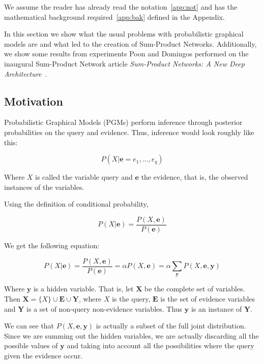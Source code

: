 \documentclass[a4paper,10pt]{article}
\theoremstyle{plain}
\begin{document}
We assume the reader has already read the notation~\ref{app:not} and has the mathematical
background required~\ref{app:bak} defined in the Appendix.

In this section we show what the usual problems with probabilistic graphical models are and what
led to the creation of Sum-Product Networks. Additionally, we show some results from experiments
Poon and Domingos performed on the inaugural Sum-Product Network article \textit{Sum-Product
Networks: A New Deep Architecture}~\cite{poon-domingos}.

\subsection{Motivation}

Probabilistic Graphical Models (PGMs) perform inference through posterior probabilities on the
query and evidence. Thus, inference would look roughly like this:

\begin{equation*}
  P(X | \mathbf{e}=e_1,\ldots,e_q)
\end{equation*}

Where $X$ is called the variable query and $\mathbf{e}$ the evidence, that is, the observed
instances of the variables.

Using the definition of conditional probability,

\begin{equation*}
  P(X|\mathbf{e})=\frac{P(X,\mathbf{e})}{P(\mathbf{e})}
\end{equation*}

We get the following equation:

\begin{equation}
  P(X|\mathbf{e})=\frac{P(X,\mathbf{e})}{P(\mathbf{e})}=\alpha P(X,\mathbf{e})=\alpha
  \sum_{\mathbf{y}} P(X,\mathbf{e},\mathbf{y})
\end{equation}

Where $\mathbf{y}$ is a hidden variable. That is, let $\mathbf{X}$ be the complete set of
variables. Then $\mathbf{X}=\{X\} \cup \mathbf{E} \cup \mathbf{Y}$, where $X$ is the query,
$\mathbf{E}$ is the set of evidence variables and $\mathbf{Y}$ is a set of non-query non-evidence
variables. Thus $\mathbf{y}$ is an instance of $\mathbf{Y}$.

We can see that $P(X,\mathbf{e},\mathbf{y})$ is actually a subset of the full joint distribution.
Since we are summing out the hidden variables, we are actually discarding all the possible values
of $\mathbf{y}$ and taking into account all the possibilities where the query given the evidence
occur.
\end{document}
